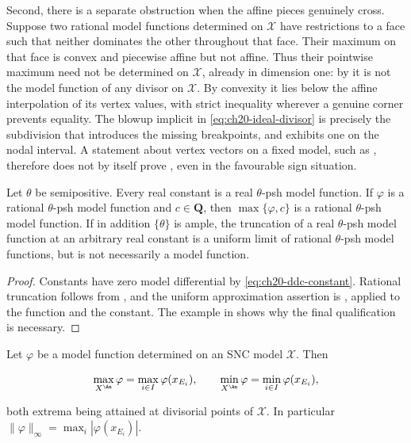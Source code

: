 \begin{example}
Second, there is a separate obstruction when the affine pieces genuinely
cross.  Suppose two rational model functions determined on \(\mathcal X\)
have restrictions to a face such that neither dominates the other
throughout that face.  Their maximum on that face is convex and piecewise
affine but not affine.  Thus their pointwise maximum need not be
determined on \(\mathcal X\), already in dimension one: by
 it is not the model function of any
divisor on \(\mathcal X\).  By convexity it lies below the affine
interpolation of its vertex values, with strict inequality wherever a
genuine corner prevents equality.  The blowup implicit in
\eqref{eq:ch20-ideal-divisor} is precisely the subdivision that introduces
the missing breakpoints, and  exhibits one on the
nodal interval.  A statement about vertex vectors on a fixed model, such as
, therefore does not by itself prove
, even in the favourable sign situation.
\end{example}

\begin{corollary}
\label{cor:ch20-truncation}
Let \(\theta\) be semipositive.  Every real constant is a real
\(\theta\)-psh model function.  If \(\varphi\) is a rational
\(\theta\)-psh model function and \(c\in\mathbf Q\), then
\(\max\{\varphi,c\}\) is a rational \(\theta\)-psh model function.
If in addition \(\{\theta\}\) is ample, the truncation of a real
\(\theta\)-psh model function at an arbitrary real constant is a uniform
limit of rational \(\theta\)-psh model functions, but is not necessarily
a model function.
\end{corollary}

\begin{proof}
Constants have zero model differential by
\eqref{eq:ch20-ddc-constant}.  Rational truncation follows from
, and the uniform approximation assertion is
, applied to the function
and the constant.  The example in
 shows why the final
qualification is necessary.
\end{proof}

\begin{proposition}
\label{prop:ch20-maximum-principle}
Let \(\varphi\) be a model function determined on an SNC model
\(\mathcal X\).  Then

\begin{equation}
\label{eq:ch20-maximum-principle}
 \max_{X^{\An}}\varphi=\max_{i\in I}\varphi(x_{E_i}),
 \qquad
 \min_{X^{\An}}\varphi=\min_{i\in I}\varphi(x_{E_i}),
\end{equation}

both extrema being attained at divisorial points of \(\mathcal X\).  In
particular \(\|\varphi\|_\infty=\max_i|\varphi(x_{E_i})|\).
\end{proposition}

